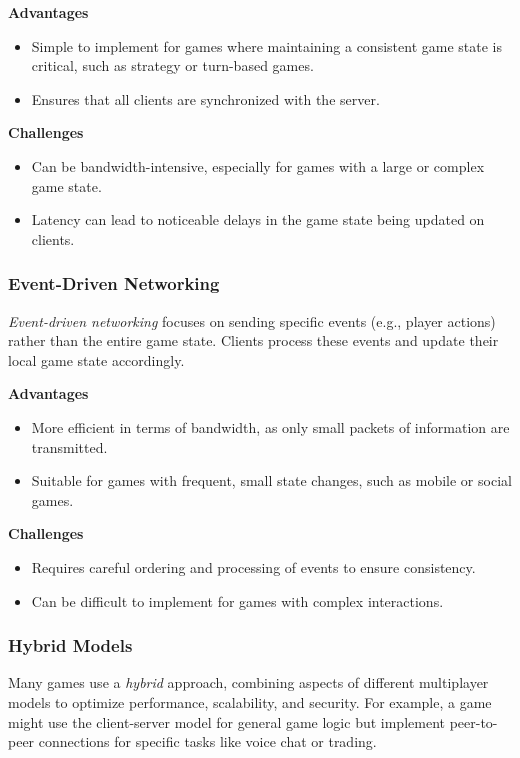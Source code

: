 \documentclass{article} %
\begin{document}
\textbf{Advantages}
\begin{itemize}
    \item Simple to implement for games where maintaining a consistent game state is critical, such as strategy or turn-based games.
    \item Ensures that all clients are synchronized with the server.
\end{itemize}

\textbf{Challenges}
\begin{itemize}
    \item Can be bandwidth-intensive, especially for games with a large or complex game state.
    \item Latency can lead to noticeable delays in the game state being updated on clients.
\end{itemize}

\subsubsection{Event-Driven Networking}
\textit{Event-driven networking} focuses on sending specific events (e.g., player actions) rather than the entire game state. Clients process these events and update their local game state accordingly.

\textbf{Advantages}
\begin{itemize}
    \item More efficient in terms of bandwidth, as only small packets of information are transmitted.
    \item Suitable for games with frequent, small state changes, such as mobile or social games.
\end{itemize}

\textbf{Challenges}
\begin{itemize}
    \item Requires careful ordering and processing of events to ensure consistency.
    \item Can be difficult to implement for games with complex interactions.
\end{itemize}

\subsubsection{Hybrid Models}
Many games use a \textit{hybrid} approach, combining aspects of different multiplayer models to optimize performance, scalability, and security. For example, a game might use the client-server model for general game logic but implement peer-to-peer connections for specific tasks like voice chat or trading.
\end{document}

